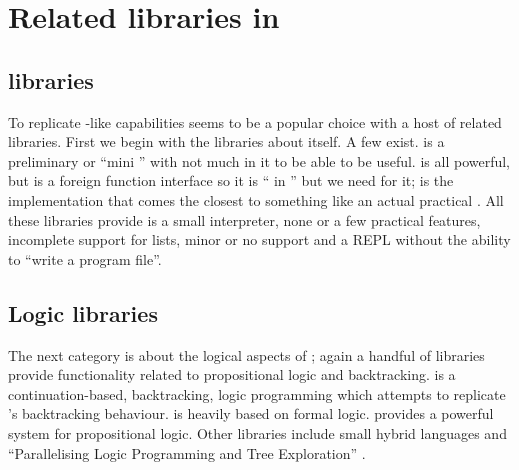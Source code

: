 \documentclass[thesis-solanki.tex]{subfiles}
\begin{document}
\section{Related libraries in }
\subsection{ libraries}

To replicate -like capabilities  seems to be a popular choice with a host of
related libraries.
First we begin with the libraries about  itself.
A few exist.
\cite{nanoprolog-lib} is a preliminary or ``mini '' with not much in it to be able to be useful.
\cite{hswip-lib} is all powerful, but is a foreign function interface so it is `` in
'' but we need  for it; \cite{prolog-lib} is the implementation that comes the
closest to something like an actual practical .
All these libraries provide is a small interpreter, none or a few practical features, incomplete support for lists,
minor or no  support and a REPL without the ability to ``write a 
program file''.

\subsection{Logic libraries}

The next category is about the logical aspects of ; again a handful of libraries provide
functionality related to propositional logic and backtracking.
\cite{logict-lib} is a continuation-based, backtracking, logic programming  which attempts
to replicate
's backtracking behaviour.
 is heavily based on formal logic.
\cite{proplogic-lib} provides a powerful system for propositional logic.
Other libraries include small hybrid languages \cite{cflp-lib} and ``Parallelising Logic Programming and Tree
Exploration'' \cite{logic-grows-on-trees-lib}.


\end{document}
